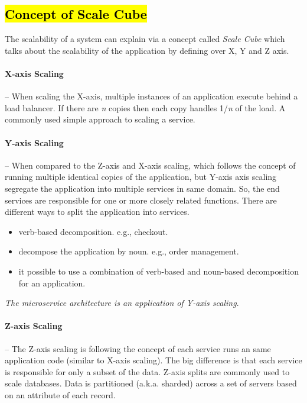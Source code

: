 \subsection{\hl{Concept of Scale Cube}}
\label{subse:scale_cube}
The scalability of a system can explain via a concept called \emph{Scale Cube} which talks about the scalability of the application by defining over X, Y and Z axis.

\paragraph{X-axis Scaling}-- When scaling the X-axis, multiple instances of an application execute behind a load balancer. If there are \textit{n} copies then each copy handles 1/\textit{n} of the load. A commonly used simple approach to scaling a service.

\paragraph{Y-axis Scaling}-- When compared to the Z-axis and X-axis scaling, which follows the concept of running multiple identical copies of the application, but Y-axis axis scaling segregate the application into multiple services in same domain. So, the end services are responsible for one or more closely related functions. There are different ways to split the application into services.
\begin{itemize}
    \item verb-based decomposition. e.g., checkout.
    \item decompose the application by noun. e.g., order management. 
    \item it possible to use a combination of verb-based and noun-based decomposition for an application.
\end{itemize}

\emph{The microservice architecture is an application of Y-axis scaling}.

\paragraph{Z-axis Scaling}-- The Z-axis scaling is following the concept of each service runs an same application code (similar to X-axis scaling). The big difference is that each service is responsible for only a subset of the data. 
Z-axis splits are commonly used to scale databases. Data is partitioned (a.k.a. sharded) across a set of servers based on an attribute of each record.

